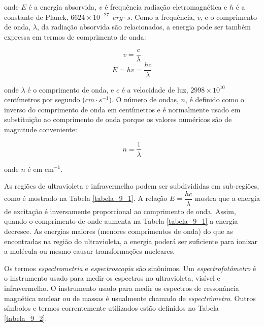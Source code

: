 \noindent onde $E$ é a energia absorvida, $v$ é frequência radiação eletromagnética e $h$ é a constante de Planck, $6624 \times 10^{-27}\enspace erg \cdot s$. Como a frequência, $v$, e o comprimento de onda, $\lambda$, da radiação absorvida são relacionados, a energia pode ser também expressa em termos de comprimento de onda:

\begin{equation}
    v = \dfrac{c}{\lambda}
\end{equation}
\begin{equation}
    E = hv = \dfrac{hc}{\lambda}
\end{equation}

\noindent onde $\lambda$ é o comprimento de onda, e $c$ é a velocidade de luz, $2998 \times 10^{10}$ centímetros por segundo ($cm \cdot s^{-1}$). O número de ondas, $n$, é definido como o inverso do comprimento de onda em centímetros e é normalmente usado em substituição ao comprimento de onda porque os valores numéricos são de magnitude conveniente:

\begin{equation}
    n = \dfrac{1}{\lambda}
\end{equation}

\noindent onde $n$ é em cm$^{-1}$.

As regiões de ultravioleta e infravermelho podem ser subdivididas em sub-regiões, como é mostrado na Tabela \ref{tabela_9_1}. A relação $E = \dfrac{hc}{\lambda}$ mostra que a energia de excitação é inversamente proporcional ao comprimento de onda. Assim, quando o comprimento de onde aumenta na Tabela \ref{tabela_9_1} a energia decresce. As energias maiores (menores comprimentos de onda) do que as encontradas na região do ultravioleta, a energia poderá ser suficiente para ionizar a molécula ou mesmo causar transformações nucleares.

Os termos \textit{espectrometria} e \textit{espectroscopia} são sinônimos. Um \textit{espectrofotômetro} é o instrumento usado para medir os espectros no ultravioleta, visível e infravermelho. O instrumento usado para medir os espectros de ressonância magnética nuclear ou de massas é usualmente chamado de \textit{espectrômetro}. Outros símbolos e termos correntemente utilizados estão definidos no Tabela \ref{tabela_9_2}.

